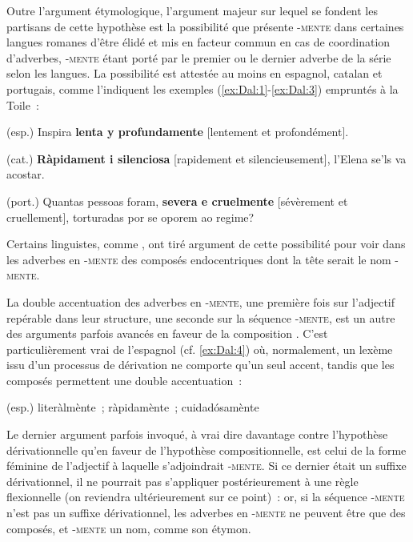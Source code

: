 \documentclass[output=paper]{langsci/langscibook}
\begin{document}
Outre l'argument étymologique, l'argument majeur sur lequel se fondent les partisans de cette hypothèse est la possibilité que présente -\textsc{mente} dans certaines langues romanes d'être élidé et mis en facteur commun en cas de coordination d'adverbes, -\textsc{mente} étant porté par le premier ou le dernier adverbe de la série selon les langues. La possibilité est attestée au moins en espagnol, catalan et portugais, comme l'indiquent les exemples (\ref{ex:Dal:1}-\ref{ex:Dal:3}) empruntés à la Toile~:

\ea\label{ex:Dal:1} (esp.) Inspira \textbf{lenta y profundamente} {[}lentement et profondément{]}.

\ex\label{ex:Dal:2} (cat.) \textbf{Ràpidament i silenciosa} {[}rapidement et silencieusement{]}, l'Elena se'ls va acostar.

\ex\label{ex:Dal:3} (port.) Quantas pessoas foram, \textbf{severa e cruelmente} {[}sévèrement et cruellement{]}, torturadas por se oporem ao regime?

\z

Certains linguistes, comme %
\citet{Saporta90}%
%
, ont tiré argument de cette possibilité pour voir dans les adverbes en \textsc{-mente} des composés endocentriques dont la tête serait le nom \textsc{-mente}.

La double accentuation des adverbes en \textsc{-mente}, une première fois sur l'adjectif repérable dans leur structure, une seconde sur la séquence \textsc{-mente}, est un autre des arguments parfois avancés en faveur de la composition %
\citep{Saporta90,Detges15}%
%
. C'est particulièrement vrai de l'espagnol (cf. \ref{ex:Dal:4}) où, normalement, un lexème issu d'un processus de dérivation ne comporte qu'un seul accent, tandis que les composés permettent une double accentuation~:

\ea\label{ex:Dal:4} (esp.) literàlmènte~; ràpidamènte~; cuidadósamènte ~
\z

Le dernier argument parfois invoqué, à vrai dire davantage contre l'hypothèse dérivationnelle qu'en faveur de l'hypothèse compositionnelle, est celui de la forme féminine de l'adjectif à laquelle s'adjoindrait -\textsc{mente}. Si ce dernier était un suffixe dérivationnel, il ne pourrait pas s'appliquer postérieurement à une règle flexionnelle (on reviendra ultérieurement sur ce point)~: or, si la séquence \textsc{-mente} n'est pas un suffixe dérivationnel, les adverbes en \textsc{-mente} ne peuvent être que des composés, et \textsc{-mente} un nom, comme son étymon.
\end{document}
